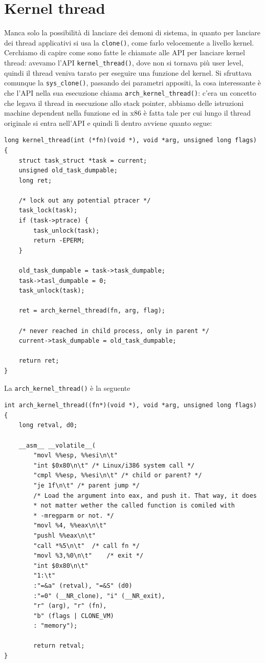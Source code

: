 \documentclass[12pt, oneside]{extbook}
\begin{document}
\section{Kernel thread}
Manca solo la possibilità di lanciare dei demoni di sistema, in quanto per lanciare dei thread applicativi si usa la \texttt{clone()}, come farlo velocemente a livello kernel.\\Cerchiamo di capire come sono fatte le chiamate alle API per lanciare kernel thread: avevamo l'API \texttt{kernel\_thread()}, dove non si tornava più user level, quindi il thread veniva tarato per eseguire una funzione del kernel. Si sfruttava comunque la \texttt{sys\_clone()}, passando dei parametri appositi, la cosa interessante è che l'API nella sua esecuzione chiama \texttt{arch\_kernel\_thread()}: c'era un concetto che legava il thread in esecuzione allo stack pointer, abbiamo delle istruzioni machine dependent nella funzione ed in x86 è fatta tale per cui lungo il thread originale si entra nell'API e quindi lì dentro avviene quanto segue:
\begin{lstlisting}
long kernel_thread(int (*fn)(void *), void *arg, unsigned long flags)
{
	struct task_struct *task = current;
	unsigned old_task_dumpable;
	long ret;
	
	/* lock out any potential ptracer */
	task_lock(task);
	if (task->ptrace) {
		task_unlock(task);
		return -EPERM;
	}

	old_task_dumpable = task->task_dumpable;
	task->tasl_dumpable = 0;
	task_unlock(task);
	
	ret = arch_kernel_thread(fn, arg, flag);
	
	/* never reached in child process, only in parent */
	current->task_dumpable = old_task_dumpable;
	
	return ret;
}
\end{lstlisting}
La \texttt{arch\_kernel\_thread()} è la seguente
\begin{lstlisting}
int arch_kernel_thread((fn*)(void *), void *arg, unsigned long flags)
{
	long retval, d0;
	
	__asm__ __volatile__(
		"movl %%esp, %%esi\n\t"
		"int $0x80\n\t"	/* Linux/i386 system call */
		"cmpl %%esp, %%esi\n\t" /* child or parent? */
		"je 1f\n\t"	/* parent jump */
		/* Load the argument into eax, and push it. That way, it does 
		* not matter wether the called function is comiled with
		* -mregparm or not. */
		"movl %4, %%eax\n\t"
		"pushl %%eax\n\t"
		"call *%5\n\t"	/* call fn */
		"movl %3,%0\n\t"	/* exit */
		"int $0x80\n\t"
		"1:\t"
		:"=&a" (retval), "=&S" (d0)
		:"=0" (__NR_clone), "i" (__NR_exit),
		"r" (arg), "r" (fn),
		"b" (flags | CLONE_VM)
		: "memory");
		
		return retval;
}
\end{lstlisting}
\end{document}
